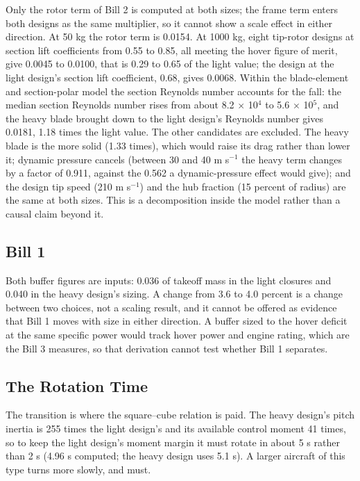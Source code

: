 \documentclass[journal]{new-aiaa}
\begin{document}
Only the rotor term of Bill 2 is computed at both sizes; the frame term enters both designs as the same multiplier, so it cannot show a scale effect in either direction. At 50 kg the rotor term is 0.0154. At 1000 kg, eight tip-rotor designs at section lift coefficients from 0.55 to 0.85, all meeting the hover figure of merit, give 0.0045 to 0.0100, that is 0.29 to 0.65 of the light value; the design at the light design's section lift coefficient, 0.68, gives 0.0068. Within the blade-element and section-polar model the section Reynolds number accounts for the fall: the median section Reynolds number rises from about 8.2 $\times$ 10$^4$ to 5.6 $\times$ 10$^5$, and the heavy blade brought down to the light design's Reynolds number gives 0.0181, 1.18 times the light value. The other candidates are excluded. The heavy blade is the more solid (1.33 times), which would raise its drag rather than lower it; dynamic pressure cancels (between 30 and 40 m s$^{-1}$ the heavy term changes by a factor of 0.911, against the 0.562 a dynamic-pressure effect would give); and the design tip speed (210 m s$^{-1}$) and the hub fraction (15 percent of radius) are the same at both sizes. This is a decomposition inside the model rather than a causal claim beyond it.

\subsection*{Bill 1}

Both buffer figures are inputs: 0.036 of takeoff mass in the light closures and 0.040 in the heavy design's sizing. A change from 3.6 to 4.0 percent is a change between two choices, not a scaling result, and it cannot be offered as evidence that Bill 1 moves with size in either direction. A buffer sized to the hover deficit at the same specific power would track hover power and engine rating, which are the Bill 3 measures, so that derivation cannot test whether Bill 1 separates.

\subsection*{The Rotation Time}

The transition is where the square--cube relation is paid. The heavy design's pitch inertia is 255 times the light design's and its available control moment 41 times, so to keep the light design's moment margin it must rotate in about 5 s rather than 2 s (4.96 s computed; the heavy design uses 5.1 s). A larger aircraft of this type turns more slowly, and must.
\end{document}
